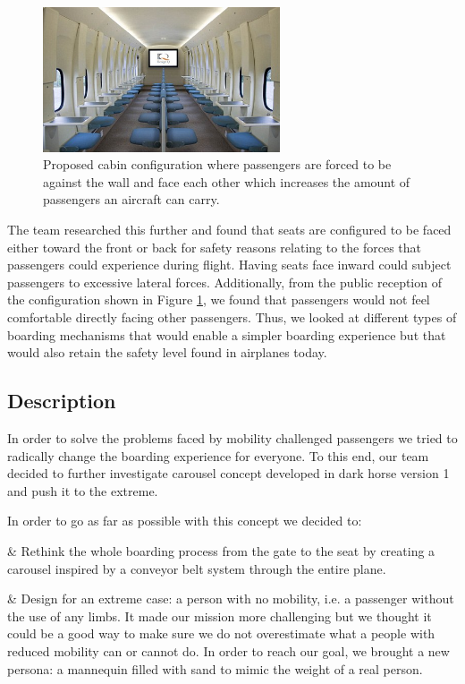 \begin{figure}[h]
  \centering
     \includegraphics[width=7cm]{images/cabin_against_wall.jpg}
   \caption{Proposed cabin configuration where passengers are forced to be against the wall and face each other which increases the amount of passengers an aircraft can carry. \cite{vertical_seating} } %
  \label{fig:cabin_against_wall.jpg}
\end{figure} 

The team researched this further and found that seats are configured to be faced either toward the front or back for safety reasons relating to the forces that passengers could experience during flight. Having seats face inward could subject passengers to excessive lateral forces. Additionally, from the public reception of the configuration shown in Figure \ref{fig:cabin_against_wall.jpg},  we found that passengers would not feel comfortable directly facing other passengers. Thus, we looked at different types of boarding mechanisms that would enable a simpler boarding experience but that would also retain the safety level found in airplanes today. 

\subsection{Description}
In order to solve the problems faced by mobility challenged passengers we tried to radically change the boarding experience for everyone. To this end, our team decided to further investigate carousel concept developed in dark horse version 1 and push it to the extreme.

In order to go as far as possible with this concept we decided to:

 \begin{easylist}[itemize]

& Rethink the whole boarding process from the gate to the seat by creating a carousel inspired by a conveyor belt system through the entire plane.

& Design for an extreme case: a person with no mobility, i.e. a passenger without the use of any limbs. It made our mission more challenging but we thought it could be a good way to make sure we do not overestimate what a people with reduced mobility can or cannot do. In order to reach our goal, we brought a new persona: a mannequin filled with sand to mimic the weight of a real person.

\end{easylist}

